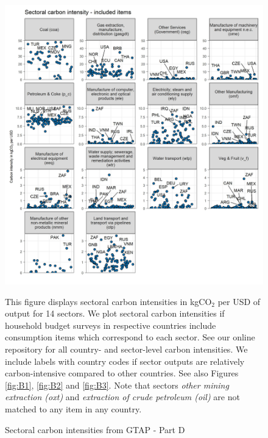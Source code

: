 \documentclass[12pt, a4paper]{article}
\newenvironment{subcaption}
{\strut
\vspace{-5pt}
\begin{minipage}[b]{0.9\textwidth}
  \hspace*{-\parindent}
  \footnotesize}
 {\end{minipage}}
\begin{document}
\begin{figure}[ht!]
  \centering
  \caption{Sectoral carbon intensities from GTAP - Part D} \label{fig:B4}
  \includegraphics{Analysis_Carbon_Intensities_GTAP/Figure_2.1.1_D_2017}
  \begin{subcaption}
    This figure displays sectoral carbon intensities in kgCO$_{2}$ per USD of output for 14 sectors. We plot sectoral carbon intensities if household budget surveys in respective countries include consumption items which correspond to each sector. See our online repository for all country- and sector-level carbon intensities. We include labels with country codes if sector outputs are relatively carbon-intensive compared to other countries. See also Figures \ref{fig:B1}, \ref{fig:B2} and \ref{fig:B3}. Note that sectors \textit{other mining extraction (oxt)} and \textit{extraction of crude petroleum (oil)} are not matched to any item in any country.
  \end{subcaption}

\end{figure}

\clearpage

\end{document}
